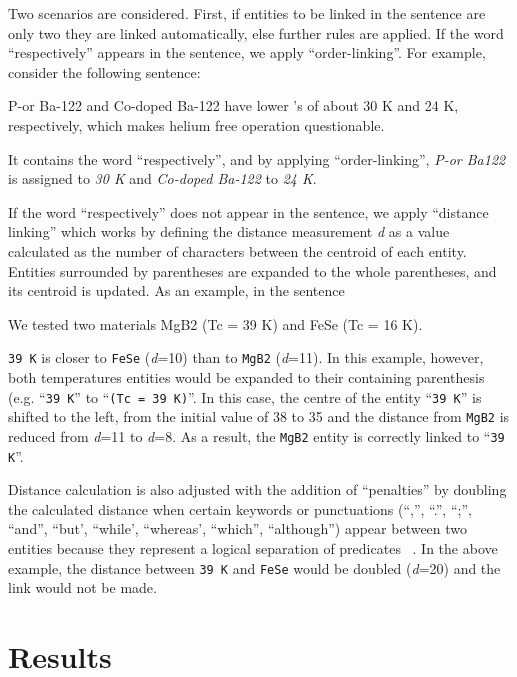 Two scenarios are considered. First, if entities to be linked in the sentence are only two they are linked automatically, else further rules are applied. 
If the word ``respectively'' appears in the sentence, we apply ``order-linking''. 
For example, consider the following sentence:
\begin{displayquote}
    P-or Ba-122  and Co-doped Ba-122 have lower \tc's of about 30 K and 24 K, respectively, which makes helium free operation questionable.
\end{displayquote}
It contains the word ``respectively'', and by applying ``order-linking'', \textit{P-or Ba122} is assigned to \textit{30 K} and \textit{Co-doped Ba-122} to \textit{24 K}.


If the word ``respectively'' does not appear in the sentence, we apply ``distance linking'' which works by defining the distance measurement \textit{d} as a value calculated as the number of characters between the centroid of each entity.
Entities surrounded by parentheses are expanded to the whole parentheses, and its centroid is updated.
As an example, in the sentence
\begin{displayquote}
    We tested two materials MgB2 (Tc = 39 K) and FeSe (Tc = 16 K).
\end{displayquote}

\texttt{39 K} is closer to \texttt{FeSe} (\textit{d}=10) than to \texttt{MgB2} (\textit{d}=11). 
In this example, however, both temperatures entities would be expanded to their containing parenthesis (e.g. ``\texttt{39 K}'' to ``\texttt{(Tc = 39 K)}''. 
In this case, the centre of the entity ``\texttt{39 K}'' is shifted to the left, from the initial value of 38 to 35 and the distance from \texttt{MgB2} is reduced from \textit{d}=11 to \textit{d}=8.
As a result, the \texttt{MgB2} entity is correctly linked to ``\texttt{39 K}''.

Distance calculation is also adjusted with the addition of ``penalties'' by doubling the calculated distance when certain keywords or punctuations (``,'', ``.'', ``;'', ``and'', ``but', ``while', ``whereas', ``which'', ``although'') appear between two entities because they represent a logical separation of predicates ~\cite{oka2021table}.
In the above example, the distance between \texttt{39 K} and \texttt{FeSe} would be doubled (\textit{d}=20) and the link would not be made.

\section{Results}

